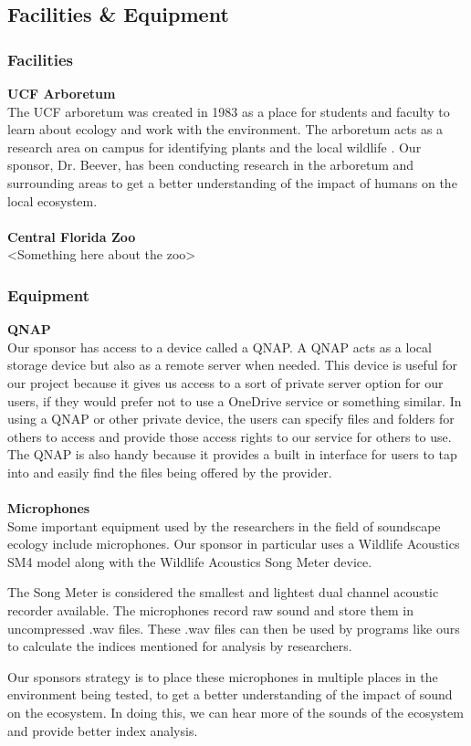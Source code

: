\subsection{Facilities \& Equipment}
\subsubsection{Facilities}
\textbf{UCF Arboretum}\\
The UCF arboretum was created in 1983 as a place for students and faculty to learn about ecology and work with the environment. The arboretum acts as a research area on campus for identifying plants and the local wildlife
\cite{ucfarboretum}. Our sponsor, Dr. Beever, has been conducting research in the arboretum and surrounding areas to get a better understanding of the impact of humans on the local ecosystem.\\\\
\textbf{Central Florida Zoo}\\
<Something here about the zoo>\\

\subsubsection{Equipment}
\textbf{QNAP}\\
Our sponsor has access to a device called a QNAP. A QNAP acts as a local storage device but also as a remote server when needed. This device is useful for our project because it gives us access to a sort of private server option for our users, if they would prefer not to use a OneDrive service or something similar. In using a QNAP or other private device, the users can specify files and folders for others to access and provide those access rights to our service for others to use. The QNAP is also handy because it provides a built in interface for users to tap into and easily find the files being offered by the provider.\\\\
\textbf{Microphones}\\
Some important equipment used by the researchers in the field of soundscape ecology include microphones. Our sponsor in particular uses a Wildlife Acoustics SM4 model along with the Wildlife Acoustics Song Meter device.\par
The Song Meter is considered the smallest and lightest dual channel acoustic recorder available\cite{songmeter}. The microphones record raw sound and store them in uncompressed .wav files. These .wav files can then be used by programs like ours to calculate the indices mentioned for analysis by researchers.\par
Our sponsor\textquotesingle s strategy is to place these microphones in multiple places in the environment being tested, to get a better understanding of the impact of sound on the ecosystem. In doing this, we can hear more of the sounds of the ecosystem and provide better index analysis.\par